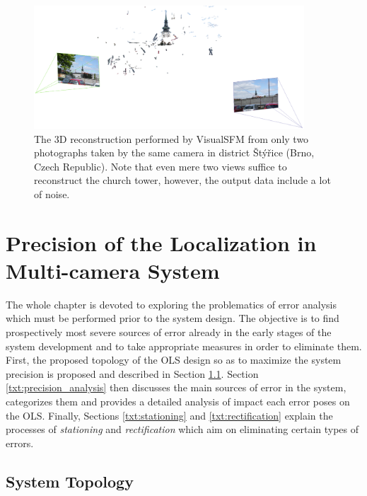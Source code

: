 \begin{figure}[tbh]
	\centering
	\includegraphics[width=0.9\textwidth]{fig/visualsfm_tower.png}
	\caption{The 3D reconstruction performed by VisualSFM from only two photographs taken by the same camera in district Štýřice (Brno, Czech Republic). Note that even mere two views suffice to reconstruct the church tower, however, the output data include a lot of noise.}
	\label{fig:visualsfm_tower}
\end{figure}

\chapter{Precision of the Localization in Multi-camera System} \label{txt:precision_of_the_localization}

The whole chapter is devoted to exploring the problematics of error analysis which must be performed prior to the system design. The objective is to find prospectively most severe sources of error already in the early stages of the system development and to take appropriate measures in order to eliminate them. First, the proposed topology of the OLS design so as to maximize the system precision is proposed and described in Section \ref{txt:system_topology}. Section \ref{txt:precision_analysis} then discusses the main sources of error in the system, categorizes them and provides a detailed analysis of impact each error poses on the OLS. Finally, Sections \ref{txt:stationing} and \ref{txt:rectification} explain the processes of \textit{stationing} and \textit{rectification} which aim on eliminating certain types of errors.

\section{System Topology} \label{txt:system_topology}

